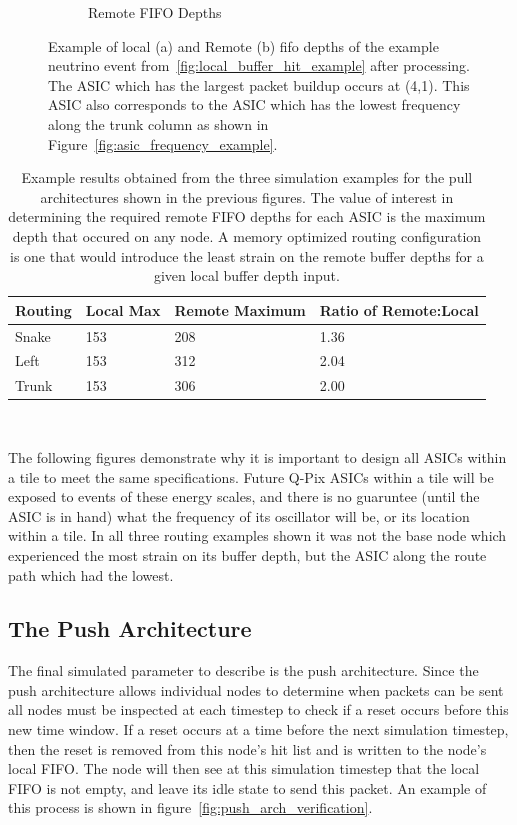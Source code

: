 \begin{figure}
\begin{subfigure}{.5\textwidth}
  \caption{Remote FIFO Depths}
\end{subfigure}
\caption{Example of local (a) and Remote (b) fifo depths of the example neutrino event from~\ref{fig:local_buffer_hit_example} after processing.
The ASIC which has the largest packet buildup occurs at (4,1).
This ASIC also corresponds to the ASIC which has the lowest frequency along the trunk column as shown in Figure~\ref{fig:asic_frequency_example}.
}
\label{fig:trunk_example_neutrino}
\end{figure}


\begin{table}
\begin{center}
\begin{tabular}{|| p{20mm} | p{40mm} | p{40mm} | p{45mm} ||}
 \hline
 Routing & Local Max & Remote Maximum & Ratio of Remote:Local \\ [0.5ex]
 \hline\hline
  Snake & 153 & 208 & 1.36 \\
 \hline
  Left & 153 & 312 & 2.04 \\
 \hline
  Trunk & 153 & 306 & 2.00 \\
 \hline
 \hline
\end{tabular}
\caption{Example results obtained from the three simulation examples for the pull architectures shown in the previous figures.
The value of interest in determining the required remote FIFO depths for each ASIC is the maximum depth that occured on any node.
A memory optimized routing configuration is one that would introduce the least strain on the remote buffer depths for a given local buffer depth input.
}
\end{center}
\end{table}
~\label{table:example_analysis}

The following figures demonstrate why it is important to design all ASICs within a tile to meet the same specifications.
Future Q-Pix ASICs within a tile will be exposed to events of these energy scales, and there is no guaruntee (until the ASIC is in hand) what the frequency of its oscillator will be, or its location within a tile. 
In all three routing examples shown it was not the base node which experienced the most strain on its buffer depth, but the ASIC along the route path which had the lowest.


\subsection{The Push Architecture}

The final simulated parameter to describe is the push architecture.
Since the push architecture allows individual nodes to determine when packets can be sent all nodes must be inspected at each timestep to check if a reset occurs before this new time window.
If a reset occurs at a time before the next simulation timestep, then the reset is removed from this node's hit list and is written to the node's local FIFO.
The node will then see at this simulation timestep that the local FIFO is not empty, and leave its idle state to send this packet.
An example of this process is shown in figure~\ref{fig:push_arch_verification}.


